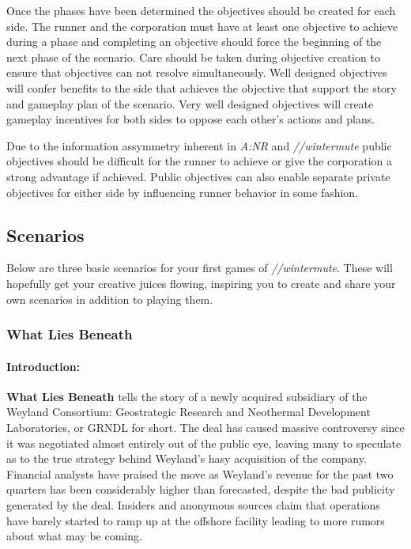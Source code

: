 \documentclass[titlepage]{article}
\begin{document}
		Once the phases have been determined the objectives should be created for each side. The runner and the corporation must have at least one objective to achieve during a phase and completing an objective should force the beginning of the next phase of the scenario. Care should be taken during objective creation to ensure that objectives can not resolve simultaneously. Well designed objectives will confer benefits to the side that achieves the objective that support the story and gameplay plan of the scenario. Very well designed objectives will create gameplay incentives for both sides to oppose each other's actions and plans.

		Due to the information assymmetry inherent in \emph{A:NR} and \emph{//wintermute} public objectives should be difficult for the runner to achieve or give the corporation a strong advantage if achieved. Public objectives can also enable separate private objectives for either side by influencing runner behavior in some fashion.

	\subsection{Scenarios}

		Below are three basic scenarios for your first games of \emph{//wintermute}. These will hopefully get your creative juices flowing, inspiring you to create and share your own scenarios in addition to playing them.

		\subsubsection{What Lies Beneath}

			\paragraph{Introduction:}

				\textbf{What Lies Beneath} tells the story of a newly acquired subsidiary of the Weyland Consortium: Geostrategic Research and Neothermal Development Laboratories, or GRNDL for short. The deal has caused massive controversy since it was negotiated almost entirely out of the public eye, leaving many to speculate as to the true strategy behind Weyland's hasy acquisition of the company. Financial analysts have praised the move as Weyland's revenue for the past two quarters has been considerably higher than forecasted, despite the bad publicity generated by the deal. Insiders and anonymous sources claim that operations have barely started to ramp up at the offshore facility leading to more rumors about what may be coming.
\end{document}
